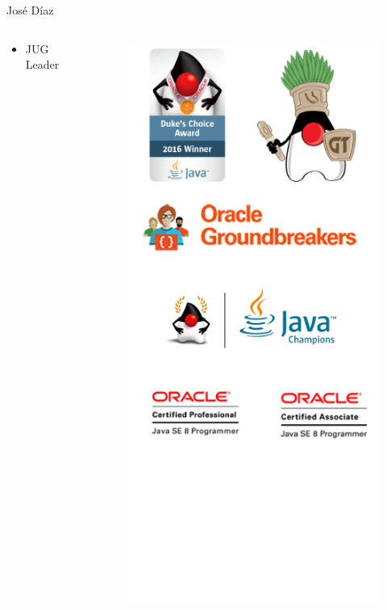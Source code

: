 \documentclass{beamer}
\begin{document}
\begin{frame}{José Díaz}
\begin{columns}[T] %
	\begin{column}[T]{5cm} %
		\begin{itemize}
			\item JUG Leader
		\end{itemize}
	\end{column}
	\begin{column}[T]{5cm} %
		\begin{figure}
			\centering
			\includegraphics[width=0.6\linewidth]{Images/logos}
		\end{figure}
		
	\end{column}
\end{columns}
\end{frame}
\end{document}
